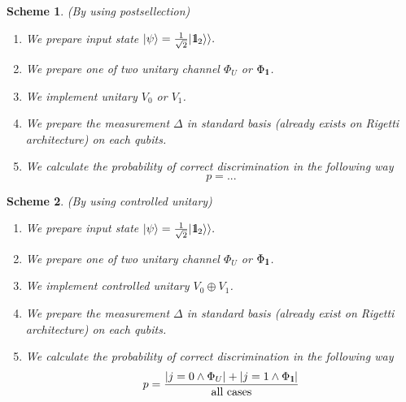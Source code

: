 \documentclass[11pt,a4paper,reqno, oneside]{amsart}
\newcommand{\ket}[1]{\ensuremath{|#1\rangle}}
\newcommand{\1}{{\rm 1\hspace{-0.9mm}l}}
\newcommand{\Id}{{\rm 1\hspace{-0.9mm}l}}
\newtheorem{scheme}{Scheme}
\begin{document}
\newpage
\begin{scheme}(By using postsellection)

\begin{enumerate}
\item We prepare input state $\ket{\psi} = \frac{1}{\sqrt{2} } | \Id_2 \rangle 
\rangle. $
\item We prepare one of two unitary channel $\Phi_{U} $ or $\Phi_{\1}$. 
\item We implement unitary $V_0 $ or $ V_1$.
\item We prepare the measurement $\Delta$ in standard basis (already exists on 
Rigetti architecture) on each qubits.
\item We calculate the probability of correct discrimination in the following 
way
\begin{equation}
p = ...
\end{equation}
\end{enumerate}
\end{scheme}


\newpage
\begin{scheme}(By using controlled unitary)

\begin{enumerate}
\item We prepare input state $\ket{\psi} = \frac{1}{\sqrt{2} } | \Id_2 \rangle 
\rangle. $
\item We prepare one of two unitary channel $\Phi_{U} $ or $\Phi_{\1}$. 
\item We implement controlled unitary $V_0 \oplus V_1$.
\item We prepare the measurement $\Delta$ in standard basis (already exist on 
Rigetti architecture) on each qubits.
\item We calculate the probability of correct discrimination in the following 
way
\begin{equation}
p = \frac{|j=0 \wedge \Phi_{U} | + |j=1 \wedge \Phi_{\1}|}{\text{all 
cases}}
\end{equation}
\end{enumerate}
\end{scheme}
\end{document}
